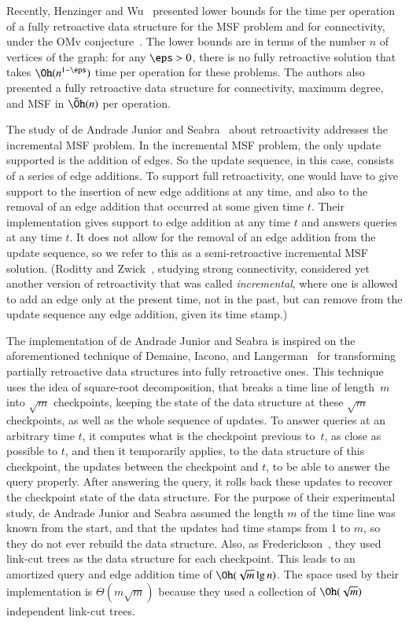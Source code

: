\documentclass[3p,times,procedia]{elsarticle}
\begin{document}
Recently, Henzinger and Wu~\cite{HenzingerW2021} presented lower bounds for the 
time per operation of a fully retroactive data structure for the MSF problem and 
for connectivity, under the OMv conjecture~\cite{HenzingerKNS2015}.  The lower 
bounds are in terms of the number $n$ of vertices of the graph: for any $\eps>0$,
there is no fully retroactive solution that takes $\Oh(n^{1-\eps})$ time per 
operation for these problems.  The authors also presented a fully retroactive
data structure for connectivity, maximum degree, and MSF in $\tilde{\Oh}(n)$ 
per operation.  

The study of de Andrade Junior and Seabra~\cite{deAndradeJrS2022} about retroactivity 
addresses the incremental MSF problem.  In the incremental MSF problem, the only update
supported is the addition of edges.  So the update sequence, in this case, consists 
of a series of edge additions.  To support full retroactivity, one would have to give 
support to the insertion of new edge additions at any time, and also to the removal 
of an edge addition that occurred at some given time $t$.  Their implementation 
gives support to edge addition at any time $t$ and answers queries at any time $t$.  
It does not allow for the removal of an edge addition from the update sequence, 
so we refer to this as a semi-retroactive incremental MSF solution.
(Roditty and Zwick~\cite{RodittyZ2016}, studying strong connectivity, considered
yet another version of retroactivity that was called \emph{incremental}, 
where one is allowed to add an edge only at the present time, not in the past, 
but can remove from the update sequence any edge addition, given its time stamp.) 

The implementation of de Andrade Junior and Seabra is inspired on the
aforementioned technique of Demaine, Iacono, and Langerman~\cite[Theorem~5]{DemaineIL2007}
for transforming partially retroactive data structures into fully retroactive ones.
This technique uses the idea of square-root decomposition,
that breaks a time line of length~$m$ into $\sqrt{m}$ checkpoints, 
keeping the state of the data structure at these $\sqrt{m}$ checkpoints, 
as well as the whole sequence of updates.  
To answer queries at an arbitrary time $t$, 
it computes what is the checkpoint previous to~$t$, as close as possible to $t$, 
and then it temporarily applies, to the data structure of this checkpoint, 
the updates between the checkpoint and $t$, to be able to answer the query properly.  
After answering the query, 
it rolls back these updates to recover the checkpoint state of the data structure.  
For the purpose of their experimental study, de Andrade Junior and Seabra assumed
the length $m$ of the time line was known from the start, and that the updates
had time stamps from 1 to $m$, so they do not ever rebuild the data structure.
Also, as Frederickson~\cite{Frederickson1983}, 
they used link-cut trees as the data structure for each checkpoint.  
This leads to an amortized query and edge addition time of $\Oh(\sqrt{m}\lg n)$.  
The space used by their implementation is $\Theta(m\sqrt{m})$ 
because they used a collection of $\Oh(\sqrt{m})$ independent link-cut trees. 
\end{document}
